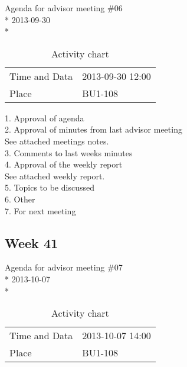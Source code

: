 \begin{center}
Agenda for advisor meeting \#06\\*
2013-09-30\\*
\end{center}

\begin{table}[H]
\begin{center}
\begin{tabular}{ l | l }
Time and Data & 2013-09-30 12:00 \\
Place & BU1-108 \\
\end{tabular}
\end{center}
\caption{Activity chart}
\label{table:activityChartAdvisorAgendaWeek40}
\end{table}


1. Approval of agenda \\
2. Approval of minutes from last advisor meeting \\
See attached meetings notes. \\
3. Comments to last weeks minutes \\
4. Approval of the weekly report \\
See attached weekly report. \\
5. Topics to be discussed \\
6. Other \\
7. For next meeting \\

\newpage
\subsection{Week 41}

\begin{center}
Agenda for advisor meeting \#07\\*
2013-10-07\\*
\end{center}

\begin{table}[H]
\begin{center}
\begin{tabular}{ l | l }
Time and Data & 2013-10-07 14:00 \\
Place & BU1-108 \\
\end{tabular}
\end{center}
\caption{Activity chart}
\label{table:activityChartAdvisorAgendaWeek41}
\end{table}



